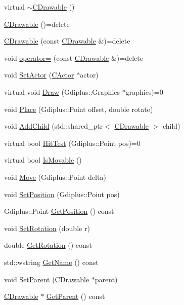 \begin{DoxyCompactItemize}
\item 
virtual \hyperlink{class_c_drawable_a58fd1036856d627b19976088e4143630}{$\sim$\+C\+Drawable} ()
\item 
\hyperlink{class_c_drawable_abd46d61baf3d5f5210aa3c66b98d9263}{C\+Drawable} ()=delete
\item 
\hyperlink{class_c_drawable_abec99c088c1a7c12e1d7ecae69135602}{C\+Drawable} (const \hyperlink{class_c_drawable}{C\+Drawable} \&)=delete
\item 
void \hyperlink{class_c_drawable_aabd5f52b903e57a4c8b145cb69158adb}{operator=} (const \hyperlink{class_c_drawable}{C\+Drawable} \&)=delete
\item 
void \hyperlink{class_c_drawable_a86762c6e220d9f502c6ccf9baf1135ac}{Set\+Actor} (\hyperlink{class_c_actor}{C\+Actor} $\ast$actor)
\item 
virtual void \hyperlink{class_c_drawable_a9b6a9920a75d88d9ae321997495eaec7}{Draw} (Gdiplus\+::\+Graphics $\ast$graphics)=0
\item 
void \hyperlink{class_c_drawable_ac154be14313b739471d3a1529a2b31b5}{Place} (Gdiplus\+::\+Point offset, double rotate)
\item 
void \hyperlink{class_c_drawable_ab636167462699dde9b80e6dcb08caf7c}{Add\+Child} (std\+::shared\+\_\+ptr$<$ \hyperlink{class_c_drawable}{C\+Drawable} $>$ child)
\item 
virtual bool \hyperlink{class_c_drawable_af715bc2e79788b2a44a74ad70b181544}{Hit\+Test} (Gdiplus\+::\+Point pos)=0
\item 
virtual bool \hyperlink{class_c_drawable_ac9f03cfc58aed75fb52cd69c71e7b6e0}{Is\+Movable} ()
\item 
void \hyperlink{class_c_drawable_a2241b02a5f50c7a455283a9fb24d5b27}{Move} (Gdiplus\+::\+Point delta)
\item 
void \hyperlink{class_c_drawable_aa6b8988df847a76c30dfcf525ab65449}{Set\+Position} (Gdiplus\+::\+Point pos)
\item 
Gdiplus\+::\+Point \hyperlink{class_c_drawable_ac1def1d34d8069e3985e3a423ba80f2d}{Get\+Position} () const 
\item 
void \hyperlink{class_c_drawable_ab1191ba99b869690839ff20cd0cc45c4}{Set\+Rotation} (double r)
\item 
double \hyperlink{class_c_drawable_afb31912cfe47cc336dfbef384181ca65}{Get\+Rotation} () const 
\item 
std\+::wstring \hyperlink{class_c_drawable_a45af045c285cd0be9340a9a0d9883260}{Get\+Name} () const 
\item 
void \hyperlink{class_c_drawable_ad53fc2430248f2ac022ab142024df983}{Set\+Parent} (\hyperlink{class_c_drawable}{C\+Drawable} $\ast$parent)
\item 
\hyperlink{class_c_drawable}{C\+Drawable} $\ast$ \hyperlink{class_c_drawable_ab09e86c9bb408d5e2756ab6b439a674c}{Get\+Parent} () const 
\end{DoxyCompactItemize}
